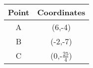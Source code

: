 \begin{tabular}{|c|c|}
\hline
   Point  & Coordinates \\
   \hline
    A & (6,-4)\\
    \hline
    B & (-2,-7)\\
    \hline
    C & (0,-$\frac{25}{4}$)\\
    \hline
\end{tabular}